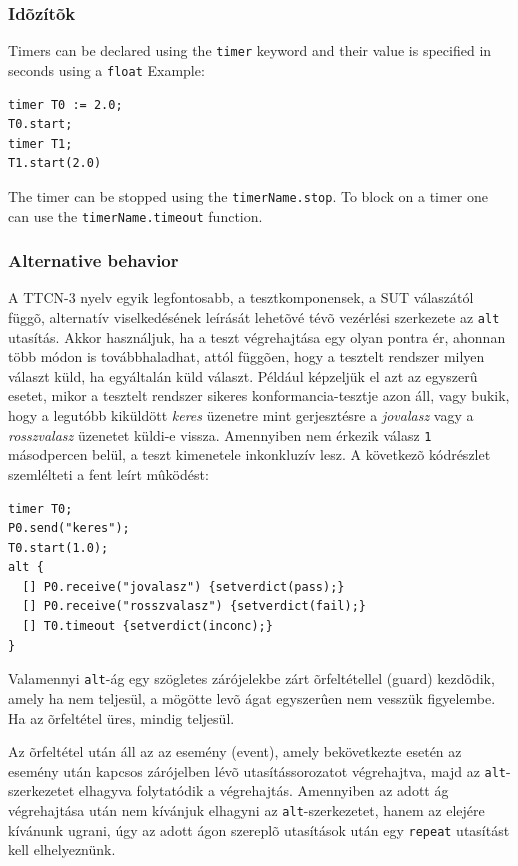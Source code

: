 \documentclass[a4paper]{article}
\begin{document}
\subsubsection{Idõzítõk}
Timers can be declared using the \verb/timer/ keyword and their value is specified in seconds using a \verb.float. Example:
{\footnotesize
\begin{lstlisting}
timer T0 := 2.0;
T0.start;
timer T1;
T1.start(2.0)
\end{lstlisting}
}

The timer can be stopped using the \verb/timerName.stop/.
To block on a timer one can use the \verb!timerName.timeout! function.

\subsubsection{Alternative behavior}

A TTCN-3 nyelv egyik legfontosabb, a tesztkomponensek, a SUT válaszától függõ, alternatív
viselkedésének leírását lehetõvé tévõ vezérlési szerkezete az \verb.alt. utasítás. Akkor használjuk,
ha a teszt végrehajtása egy olyan pontra ér, ahonnan több módon is továbbhaladhat, attól
függõen, hogy a tesztelt rendszer milyen választ küld, ha egyáltalán küld választ. Például
képzeljük el azt az egyszerû esetet, mikor a tesztelt rendszer sikeres konformancia-tesztje
azon áll, vagy bukik, hogy a legutóbb kiküldött \textit{keres} üzenetre mint gerjesztésre a
\textit{jovalasz} vagy a \textit{rosszvalasz} üzenetet küldi-e vissza. Amennyiben nem érkezik
válasz \verb/1/ másodpercen belül, a teszt kimenetele inkonkluzív lesz. A következõ kódrészlet
szemlélteti a fent leírt mûködést:

{\footnotesize
\begin{lstlisting}
timer T0;
P0.send("keres");
T0.start(1.0);
alt {
  [] P0.receive("jovalasz") {setverdict(pass);}
  [] P0.receive("rosszvalasz") {setverdict(fail);}
  [] T0.timeout {setverdict(inconc);}
}
\end{lstlisting}
}

Valamennyi \verb/alt/-ág egy szögletes zárójelekbe zárt õrfeltétellel (guard) kezdõdik, amely ha
nem teljesül, a mögötte levõ ágat egyszerûen nem vesszük figyelembe. Ha az õrfeltétel üres,
mindig teljesül. 

Az õrfeltétel után áll az
az esemény (event), amely bekövetkezte esetén az esemény után kapcsos zárójelben lévõ
utasítássorozatot végrehajtva, majd az \verb/alt/-szerkezetet elhagyva folytatódik a végrehajtás.
Amennyiben az adott ág végrehajtása után nem kívánjuk elhagyni az \verb/alt/-szerkezetet, hanem
az elejére kívánunk ugrani, úgy az adott ágon szereplõ utasítások után egy \verb/repeat/ utasítást
kell elhelyeznünk.
\end{document}
